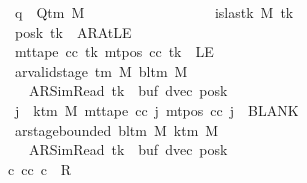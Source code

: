 \begin{isabellebody}
\ \ \ \ \ \ \ \ \ \ \ \ \ \ \ \ \ q\ {\isasymin}\ Q{\isacharunderscore}{\kern0pt}tm\ M{\isacharsemicolon}{\kern0pt}\isanewline
\ \ \ \ \ \ \ \ \ \ \ \ \ \ \ \ \ {\isasymnot}\ is{\isacharunderscore}{\kern0pt}last{\isacharunderscore}{\kern0pt}k\ M\ tk{\isacharsemicolon}{\kern0pt}\isanewline
\ \ \ \ \ \ \ \ \ \ \ \ \ \ \ \ \ posk\ tk\ {\isacharequal}{\kern0pt}\ AR{\isacharunderscore}{\kern0pt}AtLE{\isacharsemicolon}{\kern0pt}\isanewline
\ \ \ \ \ \ \ \ \ \ \ \ \ \ \ \ \ mt{\isacharunderscore}{\kern0pt}tape\ cc\ tk\ {\isacharparenleft}{\kern0pt}mt{\isacharunderscore}{\kern0pt}pos\ cc\ tk{\isacharparenright}{\kern0pt}\ {\isacharequal}{\kern0pt}\ LE{}{\isacharsemicolon}{\kern0pt}\isanewline
\ \ \ \ \ \ \ \ \ \ \ \ \ \ \ \ \ ar{\isacharunderscore}{\kern0pt}valid{\isacharunderscore}{\kern0pt}stage\ {\isacharparenleft}{\kern0pt}{\isasymGamma}{\isacharunderscore}{\kern0pt}tm\ M{\isacharparenright}{\kern0pt}\ {\isacharparenleft}{\kern0pt}bl{\isacharunderscore}{\kern0pt}tm\ M{\isacharparenright}{\kern0pt}\isanewline
\ \ \ \ \ \ \ \ \ \ \ \ \ \ \ \ \ \ \ {\isacharparenleft}{\kern0pt}AR{\isacharunderscore}{\kern0pt}SimRead{\isacharcomma}{\kern0pt}\ tk{\isacharcomma}{\kern0pt}\ {}{\isacharcomma}{\kern0pt}\ buf{\isacharcomma}{\kern0pt}\ dvec{\isacharcomma}{\kern0pt}\ posk{\isacharparenright}{\kern0pt}{\isacharsemicolon}{\kern0pt}\isanewline
\ \ \ \ \ \ \ \ \ \ \ \ \ \ \ \ \ {\isasymforall}j\ {\isasymge}\ k{\isacharunderscore}{\kern0pt}tm\ M{\isachardot}{\kern0pt}\ mt{\isacharunderscore}{\kern0pt}tape\ cc\ j\ {\isacharparenleft}{\kern0pt}mt{\isacharunderscore}{\kern0pt}pos\ cc\ j{\isacharparenright}{\kern0pt}\ {\isacharequal}{\kern0pt}\ BLANK{}{\isacharsemicolon}{\kern0pt}\isanewline
\ \ \ \ \ \ \ \ \ \ \ \ \ \ \ \ \ ar{\isacharunderscore}{\kern0pt}stage{\isacharunderscore}{\kern0pt}bounded\ {\isacharparenleft}{\kern0pt}bl{\isacharunderscore}{\kern0pt}tm\ M{\isacharparenright}{\kern0pt}\ {\isacharparenleft}{\kern0pt}k{\isacharunderscore}{\kern0pt}tm\ M{\isacharparenright}{\kern0pt}\isanewline
\ \ \ \ \ \ \ \ \ \ \ \ \ \ \ \ \ \ \ {\isacharparenleft}{\kern0pt}AR{\isacharunderscore}{\kern0pt}SimRead{\isacharcomma}{\kern0pt}\ tk{\isacharcomma}{\kern0pt}\ {}{\isacharcomma}{\kern0pt}\ buf{\isacharcomma}{\kern0pt}\ dvec{\isacharcomma}{\kern0pt}\ posk{\isacharparenright}{\kern0pt}\ {\isasymrbrakk}\isanewline
\ \ \ \ \ \ \ \ \ \ \ \ \ \ \ {\isasymLongrightarrow}\ {\isasymexists}c{\isacharprime}{\kern0pt}{\isacharprime}{\kern0pt}{\isachardot}{\kern0pt}\ {\isacharparenleft}{\kern0pt}cc{\isacharcomma}{\kern0pt}\ c{\isacharprime}{\kern0pt}{\isacharprime}{\kern0pt}{\isacharparenright}{\kern0pt}\ {\isasymin}\ R{\isacharprime}{\kern0pt}\isanewline

\end{isabellebody}
